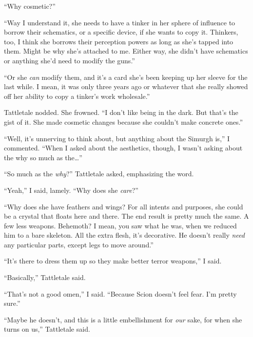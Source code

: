 ``Why cosmetic?''



``Way I understand it, she needs to have a tinker in her sphere of influence to borrow their schematics, or a specific device, if she wants to copy it.  Thinkers, too, I think she borrows their perception powers as long as she's tapped into them.  Might be why she's attached to me.  Either way, she didn't have schematics or anything she'd need to modify the guns.''



``Or she \emph{can} modify them, and it's a card she's been keeping up her sleeve for the last while.  I mean, it was only three years ago or whatever that she really showed off her ability to copy a tinker's work wholesale.''



Tattletale nodded.  She frowned.  ``I don't like being in the dark.  But that's the gist of it.  She made cosmetic changes because she couldn't make concrete ones.''



``Well, it's unnerving to think about, but anything about the Simurgh is,'' I commented.  ``When I asked about the aesthetics, though, I wasn't asking about the why so much as the\ldots''



``So much as the \emph{why}?''  Tattletale asked, emphasizing the word.



``Yeah,'' I said, lamely.  ``Why does she \emph{care}?''



``Why does she have feathers and wings?  For all intents and purposes, she could be a crystal that floats here and there.  The end result is pretty much the same.  A few less weapons.  Behemoth?  I mean, you saw what he was, when we reduced him to a bare skeleton.  All the extra flesh, it's decorative.  He doesn't really \emph{need} any particular parts, except legs to move around.''



``It's there to dress them up so they make better terror weapons,'' I said.



``Basically,'' Tattletale said.



``That's not a good omen,'' I said.  ``Because Scion doesn't feel fear.  I'm pretty sure.''



``Maybe he doesn't, and this is a little embellishment for \emph{our} sake, for when she turns on us,'' Tattletale said.



